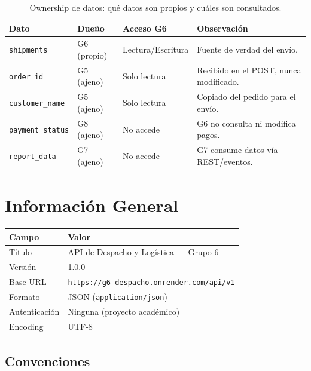\documentclass[11pt, a4paper]{article}
\begin{document}
\begin{table}[h!]
\centering
\renewcommand{\arraystretch}{1.3}
\begin{tabularx}{\textwidth}{l l l X}
  \toprule
  \textbf{Dato} & \textbf{Dueño} & \textbf{Acceso G6} & \textbf{Observación} \\
  \midrule
  \texttt{shipments}        & G6 (propio)  & Lectura/Escritura & Fuente de verdad del envío. \\
  \texttt{order\_id}        & G5 (ajeno)   & Solo lectura      & Recibido en el POST, nunca modificado. \\
  \texttt{customer\_name}   & G5 (ajeno)   & Solo lectura      & Copiado del pedido para el envío. \\
  \texttt{payment\_status}  & G8 (ajeno)   & No accede          & G6 no consulta ni modifica pagos. \\
  \texttt{report\_data}     & G7 (ajeno)   & No accede          & G7 consume datos vía REST/eventos. \\
  \bottomrule
\end{tabularx}
\caption{Ownership de datos: qué datos son propios y cuáles son consultados.}
\end{table}


\section{Información General}
\label{sec:general-info}

\begin{table}[h!]
\centering
\renewcommand{\arraystretch}{1.4}
\begin{tabularx}{\textwidth}{l X}
  \toprule
  \textbf{Campo} & \textbf{Valor} \\
  \midrule
  Título          & API de Despacho y Logística --- Grupo 6 \\
  Versión         & 1.0.0 \\
  Base URL        & \texttt{https://g6-despacho.onrender.com/api/v1} \\
  Formato         & JSON (\texttt{application/json}) \\
  Autenticación   & Ninguna (proyecto académico) \\
  Encoding        & UTF-8 \\
  \bottomrule
\end{tabularx}
\end{table}

\subsection{Convenciones}
\end{document}
